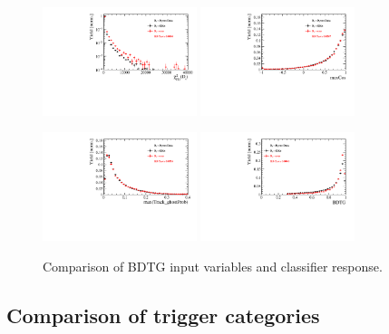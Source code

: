 \begin{figure}[h]
\includegraphics[height=!,width=0.4\textwidth]{figs/dataVsMC/finalState_norm/Ds2all_Ds_FDCHI2_ORIVX.pdf}
\includegraphics[height=!,width=0.4\textwidth]{figs/dataVsMC/finalState_norm/Ds2all_maxCos.pdf}

\includegraphics[height=!,width=0.4\textwidth]{figs/dataVsMC/finalState_norm/Ds2all_max_ghostProb.pdf}
\includegraphics[height=!,width=0.4\textwidth]{figs/dataVsMC/finalState_norm/Ds2all_BDTG_response.pdf}

\caption{Comparison of BDTG input variables and classifier response.}
\label{fig:}
\end{figure}

\clearpage
\subsection{Comparison of trigger categories}

